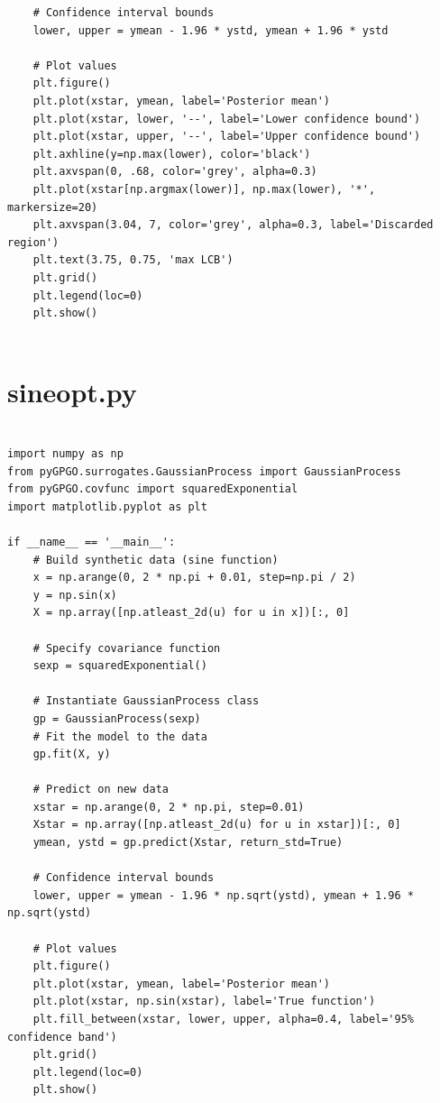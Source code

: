 \documentclass[10pt,a4paper,twoside]{book}
\begin{document}
\begin{appendices}
\begin{verbatim}
    # Confidence interval bounds
    lower, upper = ymean - 1.96 * ystd, ymean + 1.96 * ystd

    # Plot values
    plt.figure()
    plt.plot(xstar, ymean, label='Posterior mean')
    plt.plot(xstar, lower, '--', label='Lower confidence bound')
    plt.plot(xstar, upper, '--', label='Upper confidence bound')
    plt.axhline(y=np.max(lower), color='black')
    plt.axvspan(0, .68, color='grey', alpha=0.3)
    plt.plot(xstar[np.argmax(lower)], np.max(lower), '*', markersize=20)
    plt.axvspan(3.04, 7, color='grey', alpha=0.3, label='Discarded region')
    plt.text(3.75, 0.75, 'max LCB')
    plt.grid()
    plt.legend(loc=0)
    plt.show()
                     
\end{verbatim}

\section{sineopt.py}
\label{sineopt}

\begin{verbatim}

import numpy as np
from pyGPGO.surrogates.GaussianProcess import GaussianProcess
from pyGPGO.covfunc import squaredExponential
import matplotlib.pyplot as plt

if __name__ == '__main__':
    # Build synthetic data (sine function)
    x = np.arange(0, 2 * np.pi + 0.01, step=np.pi / 2)
    y = np.sin(x)
    X = np.array([np.atleast_2d(u) for u in x])[:, 0]

    # Specify covariance function
    sexp = squaredExponential()

    # Instantiate GaussianProcess class
    gp = GaussianProcess(sexp)
    # Fit the model to the data
    gp.fit(X, y)

    # Predict on new data
    xstar = np.arange(0, 2 * np.pi, step=0.01)
    Xstar = np.array([np.atleast_2d(u) for u in xstar])[:, 0]
    ymean, ystd = gp.predict(Xstar, return_std=True)

    # Confidence interval bounds
    lower, upper = ymean - 1.96 * np.sqrt(ystd), ymean + 1.96 * np.sqrt(ystd)

    # Plot values
    plt.figure()
    plt.plot(xstar, ymean, label='Posterior mean')
    plt.plot(xstar, np.sin(xstar), label='True function')
    plt.fill_between(xstar, lower, upper, alpha=0.4, label='95% confidence band')
    plt.grid()
    plt.legend(loc=0)
    plt.show()


\end{verbatim}
\end{appendices}
\end{document}
